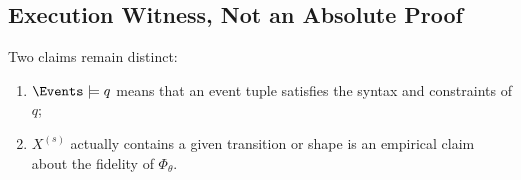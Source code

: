 \subsection{Execution Witness, Not an Absolute Proof}

Two claims remain distinct:
\begin{enumerate}
  \item $\Events\models q$ means that an event tuple satisfies the syntax and constraints of $q$;
  \item $X^{(s)}$ actually contains a given transition or shape is an empirical claim about the fidelity of $\Phi_{\theta}$.
\end{enumerate}
